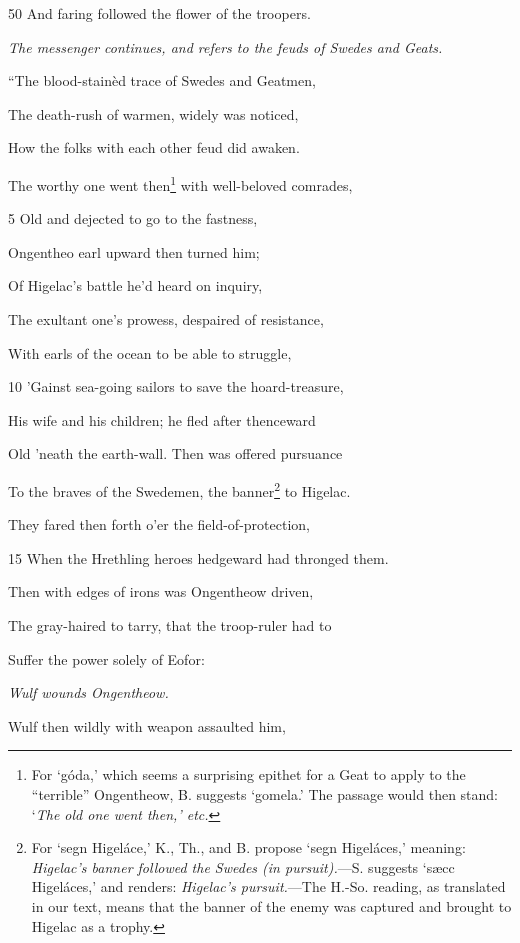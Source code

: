 50
And faring followed the flower of the troopers.



\emph{The messenger
continues, and
refers to the feuds
of Swedes and
Geats.}

“The blood-stainèd trace of Swedes and Geatmen,

The death-rush of warmen, widely was noticed,

How the folks with each other feud did awaken.

The worthy one went then\footnote{For ‘góda,’ which seems a surprising epithet for a Geat to apply to the
“terrible” Ongentheow, B. suggests ‘gomela.’ The passage would then
stand: ‘\emph{The old one went then,’ etc.}} with well-beloved comrades,

5
Old and dejected to go to the fastness,

Ongentheo earl upward then turned him;

Of Higelac’s battle he’d heard on inquiry,

The exultant one’s prowess, despaired of resistance,

With earls of the ocean to be able to struggle,

10
’Gainst sea-going sailors to save the hoard-treasure,

His wife and his children; he fled after thenceward

Old ’neath the earth-wall. Then was offered pursuance

To the braves of the Swedemen, the banner\footnote{For ‘segn Higeláce,’ K., Th., and B. propose ‘segn Higeláces,’ meaning:
\emph{Higelac’s banner followed the Swedes (in pursuit).}—S. suggests ‘sæcc Higeláces,’
and renders: \emph{Higelac’s pursuit.}—The H.-So. reading, as translated in
our text, means that the banner of the enemy was captured and brought to
Higelac as a trophy.} to Higelac.

They fared then forth o’er the field-of-protection,

15
When the Hrethling heroes hedgeward had thronged them.

Then with edges of irons was Ongentheow driven,

The gray-haired to tarry, that the troop-ruler had to

Suffer the power solely of Eofor:

\emph{Wulf wounds
Ongentheow.}

Wulf then wildly with weapon assaulted him,

